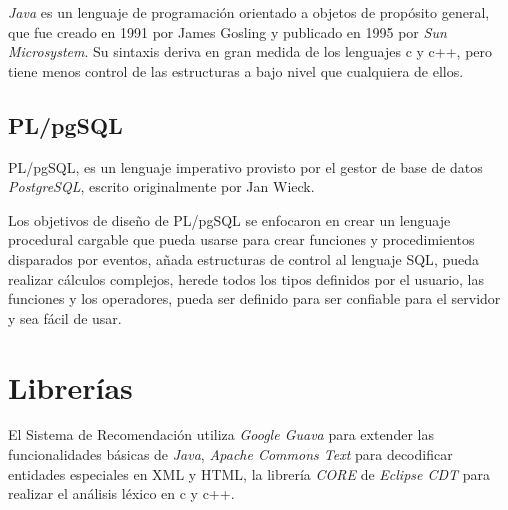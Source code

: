\textit{Java} es un lenguaje de programación orientado a objetos de propósito general,
que fue creado en 1991 por James Gosling y publicado en 1995 por \textit{Sun Microsystem}.
Su sintaxis deriva en gran medida de los lenguajes c y c++,
pero tiene menos control de las estructuras a bajo nivel que cualquiera de ellos.


\subsection{PL/pgSQL}

\ac{PL/pgSQL},
es un lenguaje imperativo provisto por el gestor de base de datos \textit{PostgreSQL},
escrito originalmente por Jan Wieck.

Los objetivos de diseño de \ac{PL/pgSQL} se enfocaron en crear un lenguaje procedural
cargable que pueda usarse para crear funciones y procedimientos disparados por eventos,
añada estructuras de control al lenguaje \ac{SQL}, pueda realizar cálculos complejos,
herede todos los tipos definidos por el usuario, las funciones y los operadores,
pueda ser definido para ser confiable para el servidor y sea fácil de usar.


\section{Librerías}
\label{sec:libs}

El Sistema de Recomendación utiliza
\textit{Google Guava} para extender las funcionalidades básicas de \textit{Java},
\textit{Apache Commons Text} para decodificar entidades especiales en \ac{XML} y \ac{HTML},
la librería \textit{CORE} de \textit{Eclipse CDT} para realizar el análisis léxico en c y c++.


